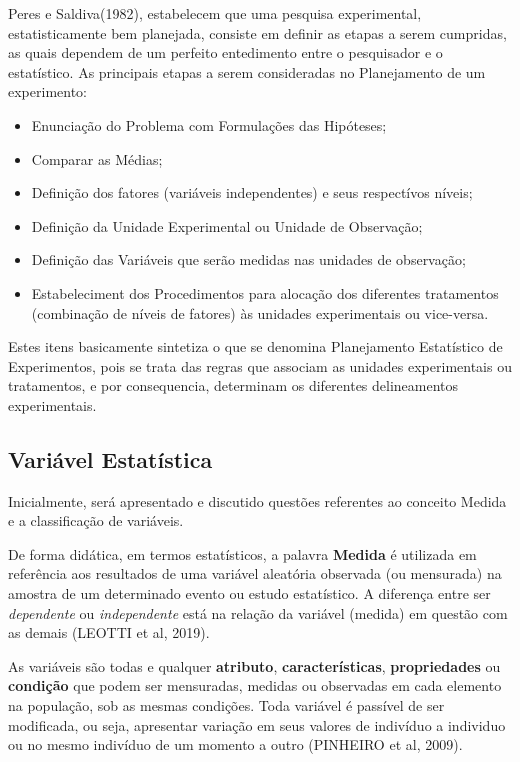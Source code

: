 Peres e Saldiva(1982), estabelecem que uma pesquisa experimental, estatisticamente bem planejada, consiste em definir as etapas a serem cumpridas, as quais dependem de um perfeito entedimento entre o pesquisador e o estatístico. As principais etapas a serem consideradas no Planejamento de um experimento:

\begin{itemize}
    \item Enunciação do Problema com Formulações das Hipóteses;
    \item Comparar as Médias;
    \item Definição dos fatores (variáveis independentes) e seus respectívos níveis;
    \item Definição da Unidade Experimental ou Unidade de Observação;
    \item Definição das Variáveis que serão medidas nas unidades de observação;
    \item Estabeleciment dos Procedimentos para alocação dos diferentes tratamentos (combinação de níveis de fatores) às unidades experimentais ou vice-versa.
\end{itemize}

Estes itens basicamente sintetiza o que se denomina Planejamento Estatístico de Experimentos, pois se trata das regras que associam as unidades experimentais ou tratamentos, e por consequencia, determinam os diferentes delineamentos experimentais.   

\subsection{Variável Estatística}

Inicialmente, será apresentado e discutido questões referentes ao conceito Medida e a classificação de variáveis.\vskip0.3cm

De forma didática, em termos estatísticos, a palavra \textbf{Medida} é utilizada em referência aos resultados de uma variável aleatória observada (ou mensurada) na amostra de um determinado evento ou estudo estatístico. A diferença entre ser \textit{dependente} ou \textit{independente} está na relação da variável (medida) em questão com as demais (LEOTTI et al, 2019).\vskip0.3cm

As variáveis são todas e qualquer \textbf{atributo}, \textbf{características}, \textbf{propriedades} ou \textbf{condição} que podem ser mensuradas, medidas ou observadas em cada elemento na população, sob as mesmas condições. Toda variável é passível de ser modificada, ou seja, apresentar variação em seus valores de indivíduo a individuo ou no mesmo indivíduo de um momento a outro (PINHEIRO et al, 2009).\vskip0.3cm 

